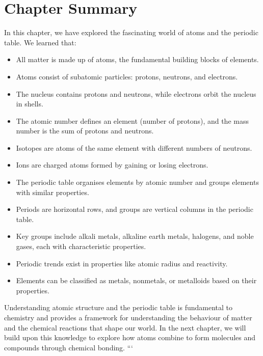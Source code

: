 \section{Chapter Summary}

In this chapter, we have explored the fascinating world of atoms and the periodic table.  We learned that:

\begin{itemize}
    \item All matter is made up of atoms, the fundamental building blocks of elements.
    \item Atoms consist of subatomic particles: protons, neutrons, and electrons.
    \item The nucleus contains protons and neutrons, while electrons orbit the nucleus in shells.
    \item The atomic number defines an element (number of protons), and the mass number is the sum of protons and neutrons.
    \item Isotopes are atoms of the same element with different numbers of neutrons.
    \item Ions are charged atoms formed by gaining or losing electrons.
    \item The periodic table organises elements by atomic number and groups elements with similar properties.
    \item Periods are horizontal rows, and groups are vertical columns in the periodic table.
    \item Key groups include alkali metals, alkaline earth metals, halogens, and noble gases, each with characteristic properties.
    \item Periodic trends exist in properties like atomic radius and reactivity.
    \item Elements can be classified as metals, nonmetals, or metalloids based on their properties.
\end{itemize}

Understanding atomic structure and the periodic table is fundamental to chemistry and provides a framework for understanding the behaviour of matter and the chemical reactions that shape our world. In the next chapter, we will build upon this knowledge to explore how atoms combine to form molecules and compounds through chemical bonding.
```